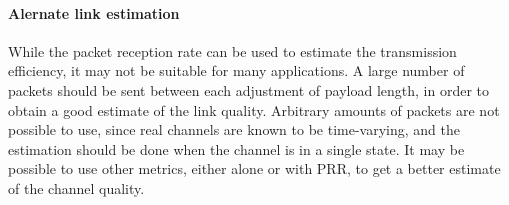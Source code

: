 \paragraph{Alernate link estimation} While the packet reception rate can be used to estimate the transmission efficiency, it may not be suitable for many applications. A large number of packets should be sent between each adjustment of payload length, in order to obtain a good estimate of the link quality. Arbitrary amounts of packets are not possible to use, since real channels are known to be time-varying, and the estimation should be done when the channel is in a single state. It may be possible to use other metrics, either alone or with PRR, to get a better estimate of the channel quality.

